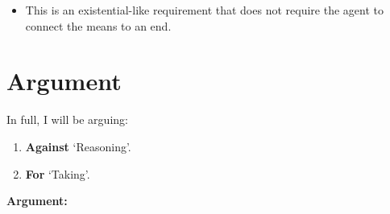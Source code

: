 \documentclass[10pt]{article}
\newcommand{\hozlinedash}[0]{%
  \noindent\hdashrule[0.5ex][c]{\textwidth}{.1pt}{2.5pt}
}
\begin{document}
\begin{itemize}
\item This is an existential-like requirement that does not require the agent to connect the means to an end.
\end{itemize}

\hozlinedash

\newpage

\section{Argument}
\label{sec:argument}

In full, I will be arguing:
\begin{enumerate}[label=\roman*., ref=(\roman*)]
\item\label{position:Against} \textbf{Against} `Reasoning'.
\item\label{position:For} \textbf{For} `Taking'.
\end{enumerate}

\noindent\textbf{Argument:}
\end{document}

